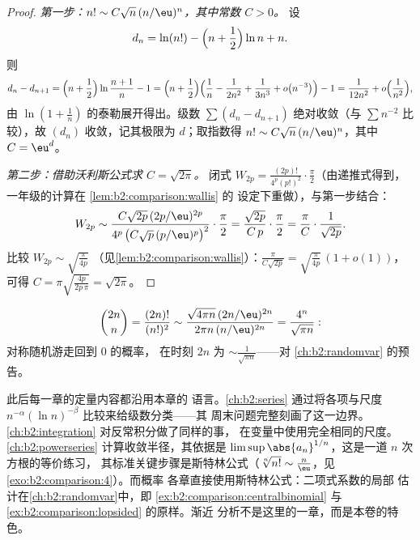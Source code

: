 \begin{proof}
\emph{第一步：$n! \sim C \sqrt n\, (n/\eu)^n$，其中常数 $C >
0$。} 设
\[
d_n = \ln(n!) - \Bigl(n + \frac12\Bigr)\ln n + n .
\]
则
\[
d_n - d_{n+1}
= \Bigl(n + \frac12\Bigr) \ln\frac{n+1}{n} - 1
= \Bigl(n + \frac12\Bigr)\Bigl(\frac1n - \frac{1}{2n^2} +
\frac{1}{3n^3} + o\bigl(n^{-3}\bigr)\Bigr) - 1
= \frac{1}{12n^2} + o\Bigl(\frac{1}{n^2}\Bigr),
\]
由 $\ln(1 + \frac1n)$ 的泰勒展开得出。级数 $\sum (d_n
- d_{n+1})$ 绝对收敛（与 $\sum
n^{-2}$ 比较），故 $(d_n)$ 收敛，记其极限为 $d$；取指数得 $n! \sim
C\sqrt n\,(n/\eu)^n$，其中 $C = \eu^{d}$。

\emph{第二步：借助沃利斯公式求 $C = \sqrt{2\pi}$。} 闭式 $W_{2p}
= \frac{(2p)!}{4^p (p!)^2}\cdot\frac\pi2$（由递推式得到，
一年级的计算在 \cref{lem:b2:comparison:wallis} 的
设定下重做），与第一步结合：
\[
W_{2p} \sim \frac{C\sqrt{2p}\,(2p/\eu)^{2p}}
{4^p\,\bigl(C\sqrt p\,(p/\eu)^p\bigr)^2}\cdot\frac{\pi}{2}
= \frac{\sqrt{2p}}{C\,p}\cdot\frac{\pi}{2}
= \frac{\pi}{C}\cdot\frac{1}{\sqrt{2p}} .
\]
比较 $W_{2p} \sim \sqrt{\frac{\pi}{4p}}$
（见\cref{lem:b2:comparison:wallis}）：$\frac{\pi}{C\sqrt{2p}} =
\sqrt{\frac{\pi}{4p}}\,(1 + o(1))$，可得 $C = \pi
\sqrt{\frac{4p}{2p\,\pi}} = \sqrt{2\pi}$。
\end{proof}

\begin{example}[中心二项式系数]\label{ex:b2:comparison:centralbinomial}
\[
\binom{2n}{n} = \frac{(2n)!}{(n!)^2}
\sim \frac{\sqrt{4\pi n}\,(2n/\eu)^{2n}}{2\pi n\,(n/\eu)^{2n}}
= \frac{4^n}{\sqrt{\pi n}} :
\]
对称随机游走回到 $0$ 的概率，
在时刻 $2n$ 为 $\sim \frac{1}{\sqrt{\pi n}}$——对
\cref{ch:b2:randomvar} 的预告。
\end{example}

\begin{remark}[本卷内的展望]\label{rem:b2:comparison:perspectives}
此后每一章的定量内容都沿用本章的
语言。\cref{ch:b2:series} 通过将各项与尺度
$n^{-\alpha}(\ln n)^{-\beta}$ 比较来给级数分类——其
周末问题完整刻画了这一边界。
\cref{ch:b2:integration} 对反常积分做了同样的事，
在变量中使用完全相同的尺度。
\cref{ch:b2:powerseries} 计算收敛半径，其依据是
$\limsup\abs{a_n}^{1/n}$，这是一道 $n$ 次方根的等价练习，
其标准关键步骤是斯特林公式（$\sqrt[n]{n!}
\sim \frac n\eu$，见\cref{exo:b2:comparison:4}）。而概率
各章直接使用斯特林公式：二项式系数的局部
估计在\cref{ch:b2:randomvar}中，即
\cref{ex:b2:comparison:centralbinomial} 与
\cref{ex:b2:comparison:lopsided} 的原样。渐近
分析不是这里的一章，而是本卷的特色。
\end{remark}

